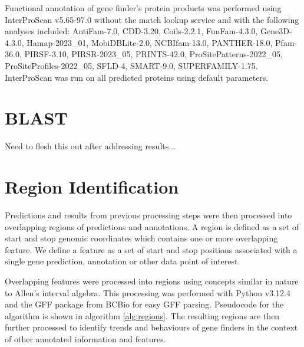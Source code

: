 Functional annotation of gene finder's protein products was performed
using InterProScan v5.65-97.0 without the match lookup service and
with the following analyses included: AntiFam-7.0, CDD-3.20,
Coils-2.2.1, FunFam-4.3.0, Gene3D-4.3.0, Hamap-2023\_01,
MobiDBLite-2.0, NCBIfam-13.0, PANTHER-18.0, Pfam-36.0, PIRSF-3.10,
PIRSR-2023\_05, PRINTS-42.0, ProSitePatterns-2022\_05,
ProSiteProfiles-2022\_05, SFLD-4, SMART-9.0,
SUPERFAMILY-1.75. InterProScan was run on all predicted proteins using
default parameters.

\section{BLAST}

Need to flesh this out after addressing results...

\section{Region Identification}

Predictions and results from previous processing steps were then
processed into overlapping regions of predictions and annotations. A
region is defined as a set of start and stop genomic coordinates which
contains one or more overlapping feature. We define a feature as a set
of start and stop positions associated with a single gene prediction,
annotation or other data point of interest.

Overlapping features were processed into regions using concepts
similar in nature to Allen's interval algebra. This processing was
performed with Python v3.12.4 and the GFF package from BCBio for easy
GFF parsing. Pseudocode for the algorithm is shown in algorithm
\ref{alg:regions}. The resulting regions are then further processed to
identify trends and behaviours of gene finders in the context of other
annotated information and features.

